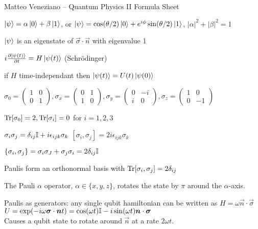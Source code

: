 Matteo Veneziano -- Quantum Physics II Formula Sheet

\begin{squishlist}
\item $\ket{\psi} = \alpha \ket{0} + \beta \ket{1}$, or $\ket{\psi} = \cos(\theta/2)\ket{0} + e^{i\phi} \sin(\theta/2)\ket{1}$, $|\alpha|^2 + |\beta|^2 = 1$
\item $\ket{\psi}$ is an eigenstate of $\vec{\sigma}\cdot \vec{n}$ with eigenvalue 1
\end{squishlist}

\begin{squishlist}
\item $i \D{t}{\ket{\psi(t)}} = H \ket{\psi(t)}$ (Schrödinger)
\item if $H$ time-independant then $\ket{\psi(t)} = U(t) \ket{\psi(0)}$
\end{squishlist}

\begin{squishlist}
\item $\sigma_0 = \begin{pmatrix} 1 & 0\\ 0 & 1 \end{pmatrix},
    \sigma_x = \begin{pmatrix} 0 & 1 \\ 1 & 0 \end{pmatrix}, 
    \sigma_y=\begin{pmatrix} 0 & -i\\ i & 0\end{pmatrix} , 
    \sigma_z = \begin{pmatrix} 1 & 0 \\ 0 & -1\end{pmatrix}$

\item $\Tr[\sigma_0] = 2, \Tr[\sigma_i] = 0$ for $i=1,2,3$
\item $\sigma_i \sigma_j = \delta_{ij} \id + i \epsilon_{ijk} \sigma_k$ \quad $[\sigma_i, \sigma_j] = 2i \epsilon_{ijk} \sigma_k$ 
\item $\{\sigma_i, \sigma_j \} = \sigma_i \sigma_J + \sigma_j\sigma_i = 2 \delta_{ij} \id$
\item Paulis form an orthonormal basis with $\Tr[\sigma_i,\sigma_j] = 2\delta_{ij}$
\item The Pauli $\alpha$ operator, $\alpha \in \{x,y,z\}$, rotates the state by $\pi$ around the $\alpha$-axis.

\item Paulis as generators: any single qubit hamiltonian can be written as $H = \omega \vec{n}\cdot \vec{\sigma}$ \\
    $U = \exp(-i\omega \vec{\sigma}\cdot \vec{n} t) = \cos(\omega t) \id - i \sin(\omega t) \vec{n}\cdot\vec{\sigma}$ \\
    Causes a qubit state to rotate around $\vec{n}$ at a rate $2\omega t$.
\end{squishlist}

